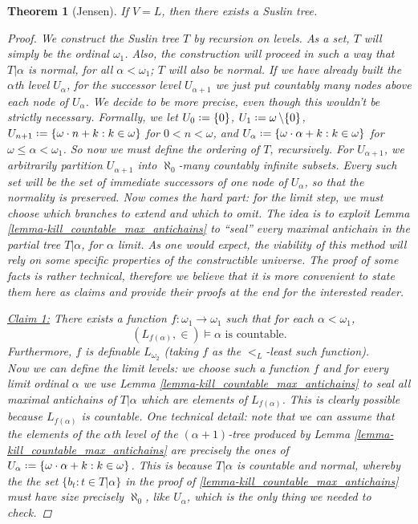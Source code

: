 \documentclass[11pt,a4paper]{report}
\newtheorem{theorem}{Theorem}[chapter] %
\theoremstyle{definition}
\theoremstyle{num.custom-title}
\theoremstyle{custom-title}
\newenvironment{claim}[1]{\par\noindent\underline{Claim#1:}\space}{} %
\DeclareMathOperator{\sm}{\setminus}
\newcommand*{\defeq}{\mathrel{\rlap{%
                     \raisebox{0.3ex}{$\cdot$}}%
                     \raisebox{-0.3ex}{$\cdot$}}%
                     =}
\begin{document}
\begin{theorem}[Jensen]\label{thm-suslin_tree_in_L}
If $V=L$, then there exists a Suslin tree.
\begin{proof}
We construct the Suslin tree $T$ by recursion on levels. As a set, $T$ will simply be the ordinal $\omega_1$. Also, the construction will proceed in such a way that $T|\alpha$ is normal, for all $\alpha < \omega_1$; $T$ will also be normal. If we have already built the $\alpha$th level $U_\alpha$, for the successor level $U_{\alpha+1}$ we just put countably many nodes above each node of $U_\alpha$. We decide to be more precise, even though this wouldn't be strictly necessary. Formally, we let $U_0 \defeq \{0\}$, $U_1 \defeq \omega \sm \{0\}$, $U_{n+1} \defeq \{ \omega \cdot n + k : k \in \omega \}$ for $0<n<\omega$, and $U_\alpha \defeq \{ \omega \cdot \alpha + k : k \in \omega \}$ for $\omega \leq \alpha < \omega_1$. So now we must define the ordering of $T$, recursively. For $U_{\alpha+1}$, we arbitrarily partition $U_{\alpha+1}$ into $\aleph_0$-many countably infinite subsets. Every such set will be the set of immediate successors of one node of $U_\alpha$, so that the normality is preserved. Now comes the hard part: for the limit step, we must choose which branches to extend and which to omit. The idea is to exploit Lemma \ref{lemma-kill_countable_max_antichains} to ``seal'' every maximal antichain in the partial tree $T|\alpha$, for $\alpha$ limit. As one would expect, the viability of this method will rely on some specific properties of the constructible universe. The proof of some facts is rather technical, therefore we believe that it is more convenient to state them here as claims and provide their proofs at the end for the interested reader.\\
\begin{claim}{ 1}
There exists a function $f \colon \omega_1 \to \omega_1$ such that for each $\alpha < \omega_1$,
\[
(L_{f(\alpha)}, \in) \models \alpha \text{ is countable}.
\]
Furthermore, $f$ is definable $L_{\omega_2}$ (taking $f$ as the $<_L$-least such function).
\end{claim}\\

Now we can define the limit levels: we choose such a function $f$ and for every limit ordinal $\alpha$ we use Lemma \ref{lemma-kill_countable_max_antichains} to seal all maximal antichains of $T|\alpha$ which are elements of $L_{f(\alpha)}$. This is clearly possible because $L_{f(\alpha)}$ is countable. One technical detail: note that we can assume that the elements of the $\alpha$th level of the $(\alpha+1)$-tree produced by Lemma \ref{lemma-kill_countable_max_antichains} are precisely the ones of $U_\alpha \defeq \{ \omega \cdot \alpha + k : k \in \omega \}$. This is because $T|\alpha$ is countable and normal, whereby the the set $\{b_t : t \in T|\alpha\}$ in the proof of \ref{lemma-kill_countable_max_antichains} must have size precisely $\aleph_0$, like $U_\alpha$, which is the only thing we needed to check.


\end{proof}
\end{theorem}
\end{document}
